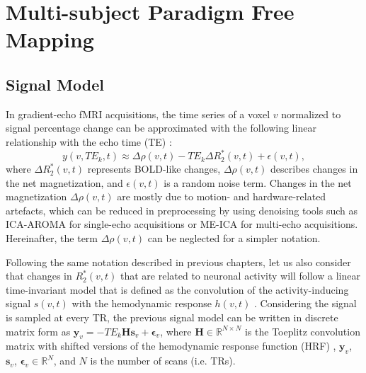 \section{Multi-subject Paradigm Free Mapping}

\subsection{Signal Model}

In gradient-echo fMRI acquisitions, the time series of a voxel $v$ normalized to
signal percentage change can be approximated with the following linear
relationship with the echo time (TE) \citep{Kundu2017MultiechofMRI}: 
\begin{equation}
    y(v,TE_k, t) \approx \Delta \rho(v,t) - TE_k \Delta
    R_2^*(v,t) + \epsilon(v,t),
\end{equation}
where $\Delta R_2^*(v,t)$ represents BOLD-like changes, $\Delta \rho(v,t)$
describes changes in the net magnetization, and $\epsilon(v,t)$ is a random
noise term. Changes in the net magnetization $\Delta \rho(v,t)$ are mostly due
to motion- and hardware-related artefacts, which can be reduced in preprocessing
by using denoising tools such as ICA-AROMA \citep{Pruim2015ICAAROMArobust} for
single-echo acquisitions or ME-ICA \citep{Kundu2012DifferentiatingBOLDnon,
Kundu2017MultiechofMRI} for multi-echo acquisitions. Hereinafter, the term
$\Delta \rho(v,t)$ can be neglected for a simpler notation. 

Following the same notation described in previous chapters, let us also consider
that changes in $R_2^*(v,t)$ that are related to neuronal activity will follow a
linear time-invariant model that is defined as the convolution of the
activity-inducing signal $s(v,t)$ with the hemodynamic response $h(v,t)$
\citep{Boynton1996LinearSystemsAnalysis,
Glover1999DeconvolutionImpulseResponse}. Considering the signal is sampled at
every TR, the previous signal model can be written in discrete matrix form as
$\mathbf{y}_{v} = -TE_ k \mathbf{H} \mathbf{s}_{v} + \boldsymbol{\epsilon}_{v}$,
where $\mathbf{H} \in \mathbb{R}^{N \times N}$ is the Toeplitz convolution
matrix with shifted versions of the hemodynamic response function (HRF)
\citep{Gitelman2003Modelingregionalpsychophysiologic,
Gaudes2013Paradigmfreemapping}, $\mathbf{y}_v$, $\mathbf{s}_v$,
$\boldsymbol{\epsilon}_{v} \in \mathbb{R}^{N}$, and $N$ is the number of scans
(i.e. TRs). 


